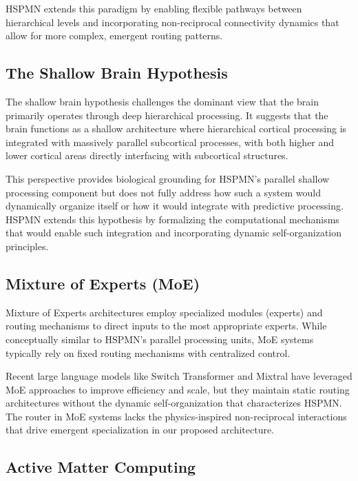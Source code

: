 \documentclass[11pt,a4paper,twocolumn]{article}
\begin{document}
HSPMN extends this paradigm by enabling flexible pathways between hierarchical levels and incorporating non-reciprocal connectivity dynamics that allow for more complex, emergent routing patterns.

\subsection{The Shallow Brain Hypothesis}

The shallow brain hypothesis \cite{suzuki2023shallow} challenges the dominant view that the brain primarily operates through deep hierarchical processing. It suggests that the brain functions as a shallow architecture where hierarchical cortical processing is integrated with massively parallel subcortical processes, with both higher and lower cortical areas directly interfacing with subcortical structures.

This perspective provides biological grounding for HSPMN's parallel shallow processing component but does not fully address how such a system would dynamically organize itself or how it would integrate with predictive processing. HSPMN extends this hypothesis by formalizing the computational mechanisms that would enable such integration and incorporating dynamic self-organization principles.

\subsection{Mixture of Experts (MoE)}

Mixture of Experts architectures \cite{eigen2013learning, jacobs1991adaptive} employ specialized modules (experts) and routing mechanisms to direct inputs to the most appropriate experts. While conceptually similar to HSPMN's parallel processing units, MoE systems typically rely on fixed routing mechanisms with centralized control.

Recent large language models like Switch Transformer \cite{fedus2022switch} and Mixtral \cite{jiang2024mixtral} have leveraged MoE approaches to improve efficiency and scale, but they maintain static routing architectures without the dynamic self-organization that characterizes HSPMN. The router in MoE systems lacks the physics-inspired non-reciprocal interactions that drive emergent specialization in our proposed architecture.

\subsection{Active Matter Computing}
\end{document}

